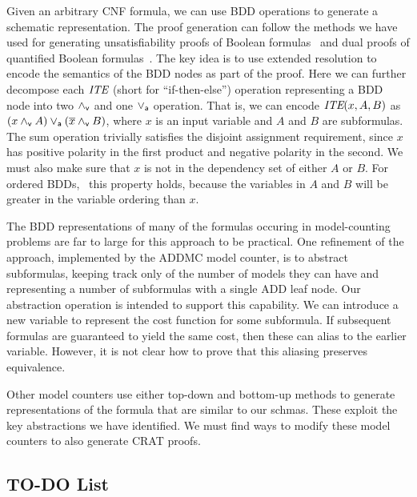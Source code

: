 \documentclass{llncs}
\newcommand{\pand}{\mathbin{\land_{\sf v}}}
\newcommand{\por}{\mathbin{\lor_{\sf a}}}
\newcommand{\obar}[1]{\overline{#1}}
\newcommand{\ite}{\mbox{\it ITE}}
\begin{document}
Given an arbitrary CNF formula, we can use BDD operations to generate
a schematic representation.  The proof generation can follow the
methods we have used for generating unsatisfiability proofs of Boolean
formulas~\cite{bryant:tacas:2021} and dual proofs of quantified
Boolean formulas~\cite{bryant:cade:2021}.  The key idea 
is to use extended resolution to encode the semantics of the BDD
nodes as part of the proof.  Here we can further decompose each $\ite$
(short for ``if-then-else'') operation representing a BDD node into
two $\pand$ and one $\por$ operation.  That is, we can encode
$\ite(x,A,B)$ as $(x \pand A) \por (\obar{x} \pand B)$, where $x$ is an
input variable and $A$ and $B$ are subformulas.  The sum operation trivially satisfies the disjoint assignment requirement, since $x$ has positive polarity in the first product and negative polarity in the second.
We must also
make sure that $x$ is not in the dependency set of either $A$ or $B$.
For ordered BDDs,~\cite{Bryant:1986} this property holds, because the
variables in $A$ and $B$ will be greater in the variable ordering than
$x$.

The BDD representations of many of the formulas occuring in
model-counting problems are far to large for this approach to be
practical.  One refinement of the approach, implemented by the ADDMC
model counter, is to abstract subformulas, keeping track only of the
number of models they can have and representing a number of subformulas
with a single ADD leaf node.  Our abstraction operation is intended to
support this capability.  We can
introduce a new variable to represent the cost function for some
subformula.  If subsequent formulas are guaranteed to yield the same
cost, then these can alias to the earlier variable.  However, it is
not clear how to prove that this aliasing preserves equivalence.

Other model counters use either top-down and bottom-up methods to
generate representations of the formula that are similar to our
schmas.  These exploit the key abstractions we have identified.  We
must find ways to modify these model counters to also generate CRAT
proofs.

\subsection{TO-DO List}
\end{document}
